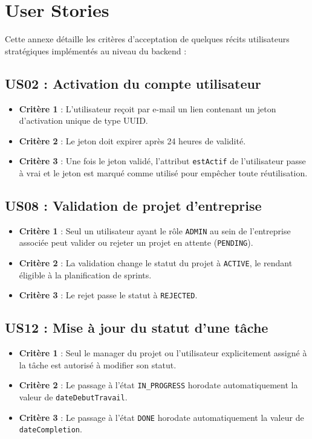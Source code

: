 \documentclass[12pt,a4paper]{report}
\begin{document}
\appendix

\chapter{User Stories}

Cette annexe détaille les critères d'acceptation de quelques récits utilisateurs stratégiques implémentés au niveau du backend :

\section*{US02 : Activation du compte utilisateur}
\begin{itemize}
\item \textbf{Critère 1} : L'utilisateur reçoit par e-mail un lien contenant un jeton d'activation unique de type UUID.
\item \textbf{Critère 2} : Le jeton doit expirer après 24 heures de validité.
\item \textbf{Critère 3} : Une fois le jeton validé, l'attribut \verb|estActif| de l'utilisateur passe à vrai et le jeton est marqué comme utilisé pour empêcher toute réutilisation.
\end{itemize}

\section*{US08 : Validation de projet d'entreprise}
\begin{itemize}
\item \textbf{Critère 1} : Seul un utilisateur ayant le rôle \verb|ADMIN| au sein de l'entreprise associée peut valider ou rejeter un projet en attente (\verb|PENDING|).
\item \textbf{Critère 2} : La validation change le statut du projet à \verb|ACTIVE|, le rendant éligible à la planification de sprints.
\item \textbf{Critère 3} : Le rejet passe le statut à \verb|REJECTED|.
\end{itemize}

\section*{US12 : Mise à jour du statut d'une tâche}
\begin{itemize}
\item \textbf{Critère 1} : Seul le manager du projet ou l'utilisateur explicitement assigné à la tâche est autorisé à modifier son statut.
\item \textbf{Critère 2} : Le passage à l'état \verb|IN_PROGRESS| horodate automatiquement la valeur de \verb|dateDebutTravail|.
\item \textbf{Critère 3} : Le passage à l'état \verb|DONE| horodate automatiquement la valeur de \verb|dateCompletion|.
\end{itemize}
\end{document}
